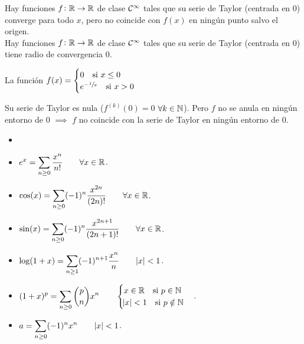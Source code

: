 \begin{obs}
    Hay funciones $f \colon \mathbb{R} \to \mathbb{R}$ de clase $\mathcal{C}^\infty$ tales que su
    serie de Taylor (centrada en 0) converge para todo $x$, pero no coincide con
    $f(x)$ en ningún punto salvo el origen. \\
    Hay funciones $f \colon \mathbb{R} \to \mathbb{R}$ de clase $\mathcal{C}^\infty$ tales que su
    serie de Taylor (centrada en 0) tiene radio de convergencia 0.
\end{obs}

\begin{example*}
    La función $f(x) = \begin{cases} 0 \quad \text{si } x \leq 0 \\
    e^{-\sfrac{1}{x}} \quad \text{si } x > 0 \end{cases}$
    \begin{center}
    \end{center}
    Su serie de Taylor es nula ($f^{(k)}(0) = 0$ $\forall k \in \mathbb{N}$). Pero $f$ no
    se anula en ningún entorno de 0 $\implies$ $f$ no coincide con la serie de
    Taylor en ningún entorno de 0.
\end{example*}

\begin{prop}
    \begin{itemize}
        \item[]
        \item $\displaystyle e^x = \sum_{n \geq 0} \frac{x^n}{n!}
            \qquad \forall x \in \mathbb{R}$.
        \item $\displaystyle \cos(x) = \sum_{n \geq 0} (-1)^{n}\frac{x^{2n}}{(2n)!}
            \qquad \forall x \in \mathbb{R}$.
        \item $\displaystyle \sin(x) = \sum_{n \geq 0} (-1)^{n}\frac{x^{2n+1}}{(2n+1)!}
            \qquad \forall x \in \mathbb{R}$.
        \item $\displaystyle \log(1+x) = \sum_{n \geq 1} (-1)^{n+1} \frac{x^n}{n}
            \qquad \abs{x} < 1$.
        \item $\displaystyle (1+x)^p = \sum_{n \geq 0} {p \choose n} x^n \qquad
            \begin{cases} x \in \mathbb{R} \quad \text{si } p \in \mathbb{N} \\ \abs{x} < 1
            \quad \text{si } p \notin \mathbb{N} \end{cases}$.
        \item $\displaystyle a = \sum_{n \geq 0} (-1)^n x^n \qquad \abs{x} < 1$.
    \end{itemize}
\end{prop}


